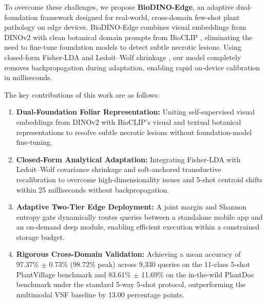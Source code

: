 \documentclass[conference]{IEEEtran}
\begin{document}
To overcome these challenges, we propose \textbf{BioDINO-Edge}, an adaptive dual-foundation framework designed for real-world, cross-domain few-shot plant pathology on edge devices. BioDINO-Edge combines visual embeddings from DINOv2 \cite{oquab2023dinov2} with clean botanical domain prompts from BioCLIP \cite{stevens2024bioclip}, eliminating the need to fine-tune foundation models to detect subtle necrotic lesions. Using closed-form Fisher-LDA \cite{fisher1936use} and Ledoit--Wolf shrinkage \cite{ledoit2004well}, our model completely removes backpropagation during adaptation, enabling rapid on-device calibration in milliseconds.

The key contributions of this work are as follows:
\begin{enumerate}
    \item \textbf{Dual-Foundation Foliar Representation:} Uniting self-supervised visual embeddings from DINOv2 \cite{oquab2023dinov2} with BioCLIP's \cite{stevens2024bioclip} visual and textual botanical representations to resolve subtle necrotic lesions without foundation-model fine-tuning.
    \item \textbf{Closed-Form Analytical Adaptation:} Integrating Fisher-LDA with Ledoit--Wolf covariance shrinkage and soft-anchored transductive recalibration to overcome high-dimensionality issues and 5-shot centroid shifts within 25 milliseconds without backpropagation.
    \item \textbf{Adaptive Two-Tier Edge Deployment:} A joint margin and Shannon entropy \cite{shannon1948mathematical} gate dynamically routes queries between a standalone mobile app and an on-demand deep module, enabling efficient execution within a constrained storage budget.
    \item \textbf{Rigorous Cross-Domain Validation:} Achieving a mean accuracy of 97.37\% $\pm$ 0.73\% (98.72\% peak) across 9,330 queries on the 11-class 5-shot PlantVillage benchmark and 83.61\% $\pm$ 11.69\% on the in-the-wild PlantDoc benchmark under the standard 5-way 5-shot protocol, outperforming the multimodal VSF baseline \cite{zhou2026vsf} by 13.00 percentage points.
\end{enumerate}
\end{document}
